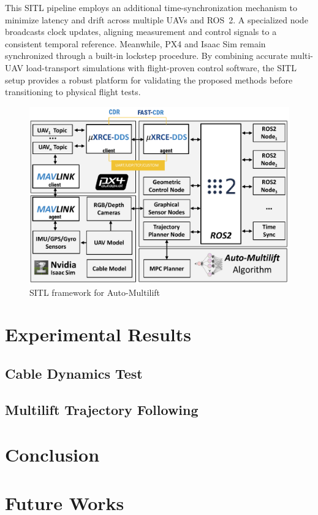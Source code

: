 \documentclass[12pt,twoside,letterpaper]{article}
\begin{document}
This SITL pipeline employs an additional time-synchronization mechanism to minimize latency and drift across multiple UAVs and ROS~2. A specialized node broadcasts clock updates, aligning measurement and control signals to a consistent temporal reference. Meanwhile, PX4 and Isaac Sim remain synchronized through a built-in lockstep procedure. By combining accurate multi-UAV load-transport simulations with flight-proven control software, the SITL setup provides a robust platform for validating the proposed methods before transitioning to physical flight tests.

\begin{figure}
    \centering
    \includegraphics[width=\linewidth]{figures/sys3.pdf}
    \caption{SITL framework for Auto-Multilift}
    \label{fig:sys_implement}
\end{figure}


\newpage
\section{Experimental Results}
\subsection{Cable Dynamics Test}

\subsection{Multilift Trajectory Following}



\newpage
\section{Conclusion}

\newpage
\section{Future Works}


\newpage
{}


\newpage
\end{document}
